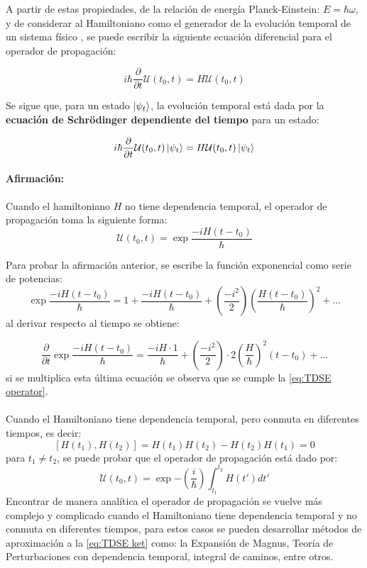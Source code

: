 A partir de estas propiedades, de la relación de energía Planck-Einstein: $E=\hbar\omega$, y de considerar al Hamiltoniano como el generador de la evolución temporal de un sistema físico \cite{Sakurai:1994}, se puede escribir la siguiente ecuación diferencial para el operador de propagación:

\begin{equation}
  \label{eq:TDSE operator}
  i\hbar\frac{\partial}{\partial t}\mathcal{U}(t_0,t) = H\mathcal{U}(t_0,t)
\end{equation}

Se sigue que, para un estado $\ket{\psi_{t}}$, la evolución temporal está dada por la \textbf{ecuación de Schrödinger dependiente del tiempo} para un estado: \cite{Tannor:2006}

\begin{tcolorbox}[colback=CTtitle!5!white,colframe=CTtitle!85!white]%
\begin{equation}
\label{eq:TDSE ket}
i\hbar\frac{\partial}{\partial t}\mathcal{U}(t_0,t)\ket{\psi_{t}} = H\mathcal{U}(t_0,t)\ket{\psi_{t}}
\end{equation}
\end{tcolorbox}

\paragraph{Afirmación:}
  Cuando el hamiltoniano $H$ no tiene dependencia temporal, el operador de propagación toma la siguiente forma:
\begin{equation}
\label{eq:U IT}
\mathcal{U}(t_0,t) = \exp{\frac{-iH(t-t_0)}{\hbar}}
\end{equation}

Para probar la afirmación anterior, se escribe la función exponencial como serie de potencias:
$$\exp{\frac{-iH(t-t_0)}{\hbar}} = 1 + \frac{-iH(t-t_0)}{\hbar}+ \left(\frac{-i^2}{2}\right)\left(\frac{H(t-t_0)}{\hbar}\right)^2+\dots $$
al derivar respecto al tiempo se obtiene:

$$\frac{\partial}{\partial t}\exp{\frac{-iH(t-t_0)}{\hbar}} = \frac{-iH\cdot 1}{\hbar}+ \left(\frac{-i^2}{2}\right)\cdot 2\left(\frac{H}{\hbar}\right)^2(t-t_0)+\dots $$
si se multiplica esta última ecuación se observa que se cumple la \autoref{eq:TDSE operator}.
\\\\
Cuando el Hamiltoniano tiene dependencia temporal, pero conmuta en diferentes tiempos, es decir:
$$[H(t_1), H(t_2)] = H(t_1)H(t_2) - H(t_2)H(t_1)=0$$
para $t_1 \neq t_2$, se puede probar que el operador de propagación está dado por:
$$\mathcal{U}(t_0,t) = \exp{-\left( \frac{i}{\hbar}\right)\int_{t_1}^{t_2}H(t')dt'}$$
Encontrar de manera analítica el operador de propagación se vuelve más complejo y complicado cuando el Hamiltoniano tiene dependencia temporal y no conmuta en diferentes tiempos, para estos casos se pueden desarrollar métodos de aproximación a la \autoref{eq:TDSE ket} como: la Expansión de Magnus, Teoría de Perturbaciones con dependencia temporal, integral de caminos, entre otros. \cite{Begzjav2020} \cite{Picasso2012}


